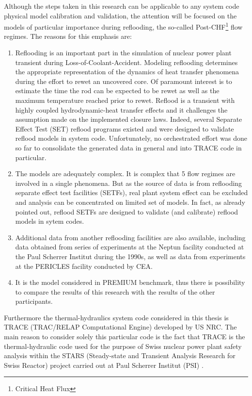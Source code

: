 \documentclass[11pt,titlepage]{article}
\begin{document}
Although the steps taken in this research can be applicable to any system code physical model calibration and validation, the attention will be focused on the models of particular importance during reflooding, the so-called Post-CHF\footnote{Critical Heat Flux} flow regimes. 
The reasons for this emphasis are:
\begin{enumerate}
	\item Reflooding is an important part in the simulation of nuclear power plant transient during Loss-of-Coolant-Accident. 
	Modeling reflooding determines the appropriate representation of the dynamics of heat transfer phenomena during the effort to rewet an uncovered core. 
	Of paramount interest is to estimate the time the rod can be expected to be rewet as well as the maximum temperature reached prior to rewet. 
	Reflood is a transient with highly coupled hydrodynamic-heat transfer effects and it challenges the assumption made on the implemented closure laws. 
	Indeed, several Separate Effect Test (SET) reflood programs existed and were designed to validate reflood models in system code. 
	Unfortunately, no orchestrated effort was done so far to consolidate the generated data in general and into TRACE code in particular.
	\item The models are adequately complex. 
	It is complex that 5 flow regimes are involved in a single phenomena. 
	But as the source of data is from reflooding separate effect test facilities (SETFs), real plant system effect can be excluded and analysis can be concentrated on limited set of models.
	In fact, as already pointed out, reflood SETFs are designed to validate (and calibrate) reflood models in sytem codes.
	\item Additional data from another reflooding facilities are also available, including data obtained from series of experiments at the Neptun facility conducted at the Paul Scherrer Institut during the 1990s, as well as data from experiments at the PERICLES facility conducted by CEA.
	\item It is the model considered in PREMIUM benchmark, thus there is possibility to compare the results of this research with the results of the other participants.
\end{enumerate}

Furthermore the thermal-hydraulics system code considered in this thesis is TRACE (TRAC/RELAP Computational Engine) developed by US NRC.
The main reason to consider solely this particular code is the fact that TRACE is the thermal-hydraulic code used for the purpose of Swiss nuclear power plant safety analysis within the STARS (Steady-state and Transient Analysis Research for Swiss Reactor) project carried out at Paul Scherrer Institut (PSI) \cite{STARS2013}.
\end{document}

